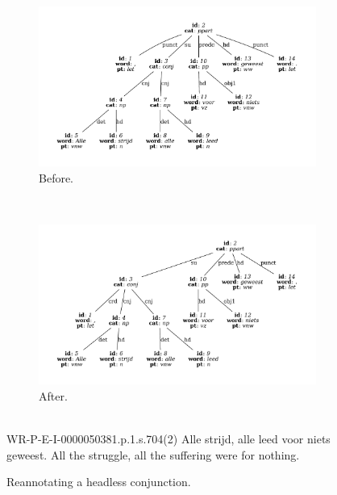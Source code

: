 \begin{figure}
	\centering
	\begin{subfigure}[b]{0.85\textwidth}
		\includegraphics[width=1\textwidth,trim={1.5cm 1.5cm 1.5cm 1.5cm}]{./prebuilt/p2crd_before.pdf}
		\caption{Before.}
	\end{subfigure}\\[\midsep]
	\begin{subfigure}[b]{0.85\textwidth}
			\includegraphics[width=1\textwidth,trim={1.5cm 1.5cm 1.5cm 1.5cm}]{./prebuilt/p2crd_after.pdf}
			\caption{After.}			
	\end{subfigure}\\[\smallsep]
	\lassycap
		{WR-P-E-I-0000050381.p.1.s.704(2)}
		{Alle strijd, alle leed voor niets geweest.}
		{All the struggle, all the suffering were for nothing.}
	\caption{Reannotating a headless conjunction.}
	\label{figure:p2crd}
\end{figure}

